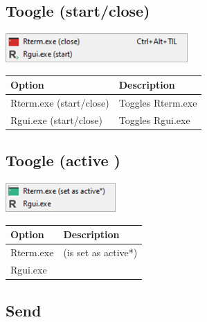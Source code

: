 \hypertarget{menu_r_toogle_start}{}
\subsection{Toogle (start/close)}

\includegraphics[scale=0.50]{./res/menu_r_toogle_start.png}\\

\begin{scriptsize}
  \begin{tabularx}{\textwidth}{>{\hsize=0.7\hsize}X>{\hsize=0.7\hsize}X}\\
    \hline
    \textbf{Option} & \textbf{Description} \\
    \hline
    Rterm.exe (start/close) & Toggles Rterm.exe \\
    Rgui.exe (start/close) & Toggles Rgui.exe \\
    \hline
  \end{tabularx}
\end{scriptsize}

\hypertarget{menu_r_toogle_active}{}
\subsection{Toogle (active \RR{})}

\includegraphics[scale=0.50]{./res/menu_r_toogle_active.png}\\

\begin{scriptsize}
  \begin{tabularx}{\textwidth}{>{\hsize=0.7\hsize}X>{\hsize=0.7\hsize}X}\\
    \hline
    \textbf{Option} & \textbf{Description} \\
    \hline
    Rterm.exe & (is set as active*) \\
    Rgui.exe \\
    \hline
  \end{tabularx}
\end{scriptsize}

\hypertarget{menu_r_send}{}
\subsection{Send}

